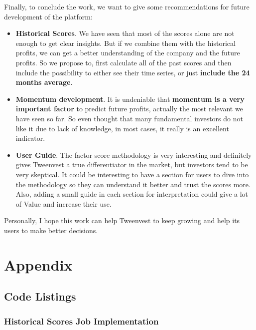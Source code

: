 \documentclass[11pt,english,a4paper,hidelinks]{book}
\begin{document}
Finally, to conclude the work, we want to give some recommendations for future development of the platform:
\begin{itemize}
    \item \textbf{Historical Scores}. We have seen that most of the scores alone are not enough to get clear insights. But if we combine them with the historical profits, we can get a better understanding of the company and the future profits. So we propose to, first calculate all of the past scores and then include the possibility to either see their time series, or just \textbf{include the 24 months average}.
    \item \textbf{Momentum development}. It is undeniable that \textbf{momentum is a very important factor} to predict future profits, actually the most relevant we have seen so far. So even thought that many fundamental investors do not like it due to lack of knowledge, in most cases, it really is an excellent indicator.
    \item \textbf{User Guide}. The factor score methodology is very interesting and definitely gives Tweenvest a true differentiator in the market, but investors tend to be very skeptical. It could be interesting to have a section for users to dive into the methodology so they can understand it better and trust the scores more. Also, adding a small guide in each section for interpretation could give a lot of Value and increase their use.
\end{itemize}

\noindent Personally, I hope this work can help Tweenvest to keep growing and help its users to make better decisions.
\printbibliography[heading=bibintoc, title=References and Bibliography]
\label{sec:biblio}
\newpage

\part{Appendix}

\chapter{Code Listings}
\section{Historical Scores Job Implementation}
\label{app:historical_scores_job}
\end{document}
